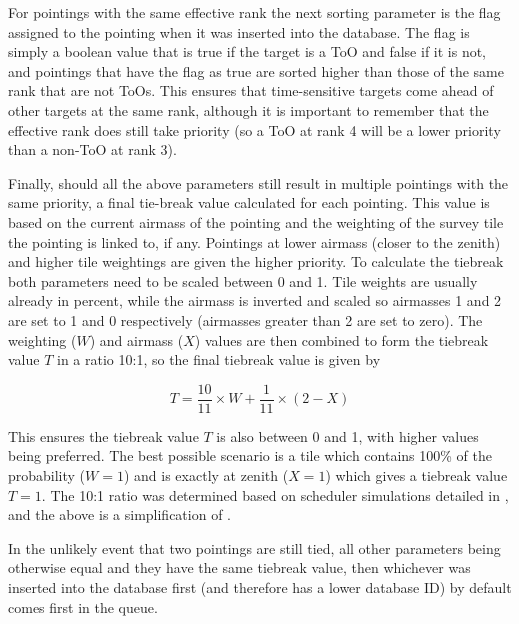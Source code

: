 \begin{colsection}
\begin{colsection}
For pointings with the same effective rank the next sorting parameter is the  flag assigned to the pointing when it was inserted into the database. The flag is simply a boolean value that is true if the target is a ToO and false if it is not, and pointings that have the flag as true are sorted higher than those of the same rank that are not ToOs. This ensures that time-sensitive targets come ahead of other targets at the same rank, although it is important to remember that the effective rank does still take priority (so a ToO at rank 4 will be a lower priority than a non-ToO at rank 3).

Finally, should all the above parameters still result in multiple pointings with the same priority, a final tie-break value calculated for each pointing. This value is based on the current airmass of the pointing and the weighting of the survey tile the pointing is linked to, if any. Pointings at lower airmass (closer to the zenith) and higher tile weightings are given the higher priority. To calculate the tiebreak both parameters need to be scaled between 0 and 1. Tile weights are usually already in percent, while the airmass is inverted and scaled so airmasses 1 and 2 are set to 1 and 0 respectively (airmasses greater than 2 are set to zero). The weighting ($W$) and airmass ($X$) values are then combined to form the tiebreak value $T$ in a ratio 10:1, so the final tiebreak value is given by

\begin{equation}
    T = \frac{10}{11} \times W + \frac{1}{11} \times (2 - X)
    \label{eq:tiebreak}
\end{equation}

This ensures the tiebreak value $T$ is also between 0 and 1, with higher values being preferred. The best possible scenario is a tile which contains 100\% of the probability ($W=1$) and is exactly at zenith ($X=1$) which gives a tiebreak value $T=1$. The 10:1 ratio was determined based on scheduler simulations detailed in , and the above  is a simplification of .

In the unlikely event that two pointings are still tied, all other parameters being otherwise equal and they have the same tiebreak value, then whichever was inserted into the database first (and therefore has a lower database ID) by default comes first in the queue.

\newpage



\end{colsection}
\end{colsection}
